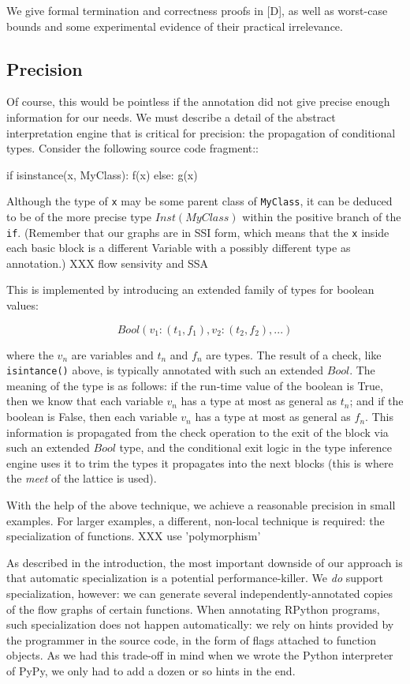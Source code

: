 \documentclass{acm_proc_article-sp}
\begin{document}
We give formal termination and correctness proofs in [D], as well as
worst-case bounds and some experimental evidence of their practical
irrelevance.


\subsection{Precision}

Of course, this would be pointless if the annotation did not give
precise enough information for our needs.  We must describe a detail of
the abstract interpretation engine that is critical for precision: the
propagation of conditional types.  Consider the following source code
fragment::

    if isinstance(x, MyClass):
        f(x)
    else:
        g(x)

Although the type of \texttt{x} may be some parent class of
\texttt{MyClass}, it can be deduced to be of the more precise type
$Inst(MyClass)$ within the positive branch of the \texttt{if}.
(Remember that our graphs are in SSI form, which means that the
\texttt{x} inside each basic block is a different Variable with a
possibly different type as annotation.) XXX flow sensivity and SSA

This is implemented by introducing an extended family of types for
boolean values:

$$
Bool(v_1: (t_1, f_1), v_2: (t_2, f_2), ...)
$$

where the $v_n$ are variables and $t_n$ and $f_n$ are types.  The
result of a check, like \texttt{isintance()} above, is typically
annotated with such an extended $Bool$.  The meaning of the type is as
follows: if the run-time value of the boolean is True, then we know
that each variable $v_n$ has a type at most as general as $t_n$; and
if the boolean is False, then each variable $v_n$ has a type at most
as general as $f_n$.  This information is propagated from the check
operation to the exit of the block via such an extended $Bool$ type,
and the conditional exit logic in the type inference engine uses it to
trim the types it propagates into the next blocks (this is where the
\textit{meet} of the lattice is used).

With the help of the above technique, we achieve a reasonable precision
in small examples.  For larger examples, a different, non-local
technique is required: the specialization of functions. XXX use 'polymorphism'

As described in the introduction, the most important downside of our
approach is that automatic specialization is a potential
performance-killer.  We \textit{do} support specialization, however: we can
generate several independently-annotated copies of the flow graphs of
certain functions.  When annotating RPython programs, such
specialization does not happen automatically: we rely on hints provided
by the programmer in the source code, in the form of flags attached to
function objects.  As we had this trade-off in mind when we wrote the
Python interpreter of PyPy, we only had to add a dozen or so hints in
the end.
\end{document}

